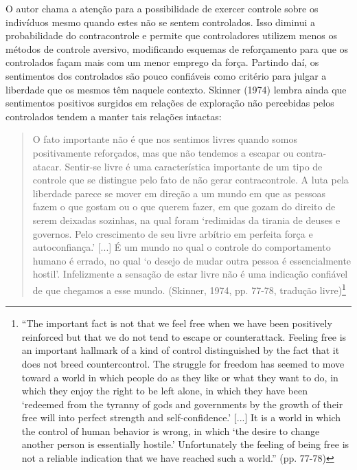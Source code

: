 O autor chama a atenção para a possibilidade de exercer controle sobre os indivíduos mesmo quando estes não se sentem controlados. Isso diminui a probabilidade do contracontrole e permite que controladores utilizem menos os métodos de controle aversivo, modificando esquemas de reforçamento para que os controlados façam mais com um menor emprego da força. Partindo daí, os sentimentos dos controlados são pouco confiáveis como critério para julgar a liberdade que os mesmos têm naquele contexto. Skinner (1974) lembra ainda que sentimentos positivos surgidos em relações de exploração não percebidas pelos controlados tendem a manter tais relações intactas:

\begin{quote}
    O fato importante não é que nos sentimos livres quando somos positivamente reforçados, mas que não tendemos a escapar ou contra-atacar. Sentir-se livre é uma característica importante de um tipo de controle que se distingue pelo fato de não gerar contracontrole. A luta pela liberdade parece se mover em direção a um mundo em que as pessoas fazem o que gostam ou o que querem fazer, em que gozam do direito de serem deixadas sozinhas, na qual foram ‘redimidas da tirania de deuses e governos. Pelo crescimento de seu livre arbítrio em perfeita força e autoconfiança.’ [...] É um mundo no qual o controle do comportamento humano é errado, no qual ‘o desejo de mudar outra pessoa é essencialmente hostil’. Infelizmente a sensação de estar livre não é uma indicação confiável de que chegamos a esse mundo. (Skinner, 1974, pp. 77-78, tradução livre)\footnote{“The important fact is not that we feel free when we have been positively reinforced but that we do not tend to escape or counterattack. Feeling free is an important hallmark of a kind of control distinguished by the fact that it does not breed countercontrol. The struggle for freedom has seemed to move toward a world in which people do as they like or what they want to do, in which they enjoy the right to be left alone, in which they have been ‘redeemed from the tyranny of gods and governments by the growth of their free will into perfect strength and self-confidence.’ [...] It is a world in which the control of human behavior is wrong, in which ‘the desire to change another person is essentially hostile.’ Unfortunately the feeling of being free is not a reliable indication that we have reached such a world.” (pp. 77-78)}
\end{quote}

